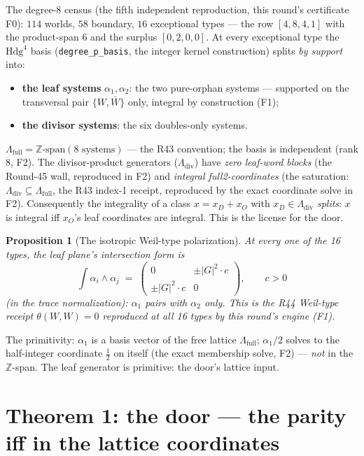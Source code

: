 \documentclass[11pt]{article}
\newtheorem{proposition}[theorem]{Proposition}
\begin{document}
The degree-8 census (the fifth independent reproduction, this round's certificate F0): $114$
worlds, $58$ boundary, $16$ exceptional types --- the row $[4,8,4,1]$ with the product-span $6$
and the surplus $[0,2,0,0]$.  At every exceptional type the $\mathrm{Hdg}^4$ basis
(\texttt{degree\_p\_basis}, the integer kernel construction) splits \emph{by support} into:
\begin{itemize}
\item \textbf{the leaf systems} $\alpha_1, \alpha_2$: the two pure-orphan systems --- supported
on the transversal pair $\{W, \bar W\}$ only, integral by construction (F1);
\item \textbf{the divisor systems}: the six doubles-only systems.
\end{itemize}
$\Lambda_{\mathrm{full}} = \mathbb{Z}\text{-span}(8 \text{ systems})$ --- the R43 convention; the
basis is independent (rank 8, F2).  The divisor-product generators
($\Lambda_{\mathrm{div}}$) have \emph{zero leaf-word blocks} (the Round-45 wall, reproduced in
F2) and \emph{integral full2-coordinates} (the saturation: $\Lambda_{\mathrm{div}} \subseteq
\Lambda_{\mathrm{full}}$, the R43 index-1 receipt, reproduced by the exact coordinate solve in
F2).  Consequently the integrality of a class $x = x_D + x_O$ with $x_D \in
\Lambda_{\mathrm{div}}$ \emph{splits}: $x$ is integral iff $x_O$'s leaf coordinates are
integral.  This is the license for the door.

\begin{proposition}[The isotropic Weil-type polarization]\label{prop:gram}
At every one of the 16 types, the leaf plane's intersection form is
\[
\int \alpha_i \wedge \alpha_j \;=\; \begin{pmatrix} 0 & \pm |G|^2 \cdot c \\ \pm |G|^2 \cdot c
& 0 \end{pmatrix}, \qquad c > 0
\]
(in the trace normalization): $\alpha_1$ pairs with $\alpha_2$ only.  This is the R44 Weil-type
receipt $\theta(W, W) = 0$ reproduced at all 16 types by this round's engine (F1).
\end{proposition}

The primitivity: $\alpha_1$ is a basis vector of the free lattice
$\Lambda_{\mathrm{full}}$; $\alpha_1 / 2$ solves to the half-integer coordinate $\tfrac12$ on
itself (the exact membership solve, F2) --- \emph{not} in the $\mathbb{Z}$-span.  The leaf
generator is primitive: the door's lattice input.

\section{Theorem 1: the door --- the parity iff in the lattice coordinates}
\end{document}
